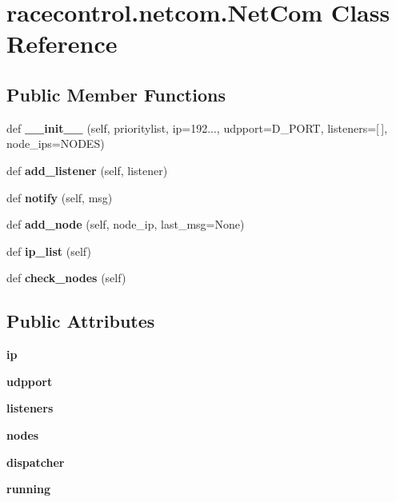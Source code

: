 \section{racecontrol.\+netcom.\+Net\+Com Class Reference}
\label{classracecontrol_1_1netcom_1_1NetCom}
\subsection*{Public Member Functions}
\begin{DoxyCompactItemize}
\item 
def {\bfseries \+\_\+\+\_\+init\+\_\+\+\_\+} (self, prioritylist, ip=\textquotesingle{}192...\textquotesingle{}, udpport=D\+\_\+\+P\+O\+RT, listeners=[$\,$], node\+\_\+ips=N\+O\+D\+ES)\label{classracecontrol_1_1netcom_1_1NetCom_a3decf896d9d62b9a3fd06dffef2b3fe5}

\item 
def {\bf add\+\_\+listener} (self, listener)
\item 
def {\bf notify} (self, msg)
\item 
def {\bf add\+\_\+node} (self, node\+\_\+ip, last\+\_\+msg=None)
\item 
def {\bf ip\+\_\+list} (self)
\item 
def {\bf check\+\_\+nodes} (self)
\end{DoxyCompactItemize}
\subsection*{Public Attributes}
\begin{DoxyCompactItemize}
\item 
{\bfseries ip}\label{classracecontrol_1_1netcom_1_1NetCom_a655c019f1760dc2aeac17059daa9003e}

\item 
{\bfseries udpport}\label{classracecontrol_1_1netcom_1_1NetCom_ab1de996cc0fbaa07ff432eb49111220a}

\item 
{\bfseries listeners}\label{classracecontrol_1_1netcom_1_1NetCom_af65e46142c5376a0e20642b064daf791}

\item 
{\bfseries nodes}\label{classracecontrol_1_1netcom_1_1NetCom_ab7425c0021edb0748e364bed18b0bdbd}

\item 
{\bfseries dispatcher}\label{classracecontrol_1_1netcom_1_1NetCom_a7220c84e9eaf348fe1e11be8d29e2c7e}

\item 
{\bfseries running}\label{classracecontrol_1_1netcom_1_1NetCom_aec956fd7586eccce58253004e0e77f83}

\end{DoxyCompactItemize}


